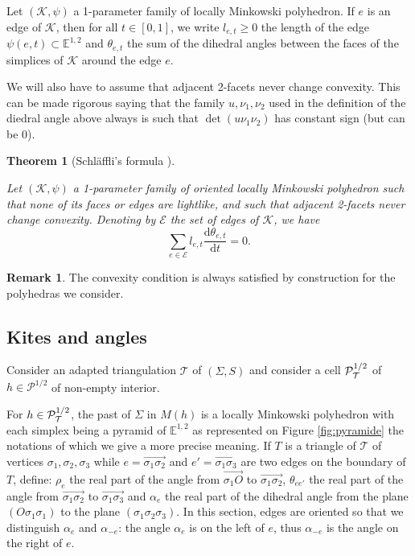 \documentclass[a4paper,12pt]{article}
\def\TT{\mathcal T}
\def\adm{\P}
\def\d{\mathrm{d}}
\newcommand{\mass}[1]{{\mathbb E}^{1,2}_{#1}}
\def\d{\mathrm{d}}
\def\adm{\mathcal{P}}
\def\P{\mathcal{P}}
\newtheorem*{theon}{Theorem}
\theoremstyle{definition}
\newtheorem*{rem}{Remark}			 %
\begin{document}
					

					Let $(\mathcal K,\psi)$ a 1-parameter family of locally Minkowski polyhedron.
					If $e$ is an edge of $\mathcal K$, then for all $t\in [0,1]$,
					 we write $l_{e,t}\geq0$ the length of the edge $\psi(e,t)\subset \mass{}$
					 and $\theta_{e,t}$ the sum of the dihedral angles between the faces of the simplices of $\mathcal K$ around the edge $e$.
					
					We will also have to assume that adjacent 2-facets never change convexity. This can be made rigorous saying that the family $u,\nu_1,\nu_2$ used in the definition of the diedral angle above always is such that $\det(u\nu_1\nu_2)$ has constant sign (but can be 0).
					
					
					\begin{theon}[Schläffli's formula \cite{MR2030165}]\
					
					 Let $(\mathcal K,\psi)$ a 1-parameter family of oriented locally Minkowski polyhedron such that none of its faces or edges are lightlike, and such that adjacent 2-facets never change convexity. 
					 Denoting by $\mathcal E$ the set of edges of $\mathcal K$, we have
					 $$ \sum_{e\in \mathcal E} l_{e,t} \frac{\d \theta_{e,t}}{\d t}=0.$$
					\end{theon}
                    
                    \begin{rem}
                     The convexity condition is always satisfied by construction for the polyhedras we consider. 
                    \end{rem}

					\subsection{Kites and angles}

					Consider an adapted triangulation $\TT$ of $(\Sigma, S)$ and consider a cell $\PsqTT$ of $h\in \adm^{1/2}$ of non-empty interior.

					For $h\in \PsqTT$, the past of $\Sigma$ in $M(h)$ is
					a locally Minkowski polyhedron with each simplex being a pyramid of $\mass{}$ as represented on Figure \ref{fig:pyramide} the notations of which we give a more precise meaning. If $T$ is a triangle of $\TT$ of vertices $\sigma_1,\sigma_2,\sigma_3$ while
					$e=\overrightarrow{\sigma_1\sigma_2}$ and $e'=\overrightarrow{\sigma_1\sigma_3}$ are two edges on the boundary of $T$,
					define: $\rho_e$ the real part of the angle from $\overrightarrow{\sigma_1O}$ to $\overrightarrow{\sigma_1\sigma_2}$,
					$\theta_{ee'}$ the real part of the angle from $\overrightarrow{\sigma_1\sigma_2}$ to $\overrightarrow{\sigma_1\sigma_3}$
					and $\alpha_e$ the real part of the dihedral angle from the plane $(O\sigma_1\sigma_1)$ to the plane $(\sigma_1\sigma_2\sigma_3)$.
					In this section, edges are oriented so that we distinguish $\alpha_e$ and $\alpha_{-e}$:
					the angle $\alpha_e$ is on the left of $e$, thus $\alpha_{-e}$ is the angle on the right of $e$.
\end{document}
